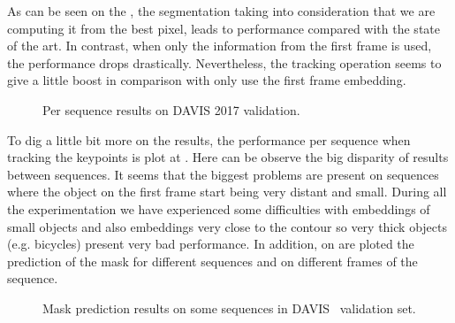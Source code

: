As can be seen on the , the segmentation taking into consideration that we are computing it from the best pixel, leads to performance compared with the state of the art.
In contrast, when only the information from the first frame is used, the performance drops drastically.
Nevertheless, the tracking operation seems to give a little boost in comparison with only use the first frame embedding.

\begin{figure}[H]
  \centering
  
  \caption{Per sequence results on DAVIS 2017 validation. }
  \label{fig:per_sequence_miou}
\end{figure}

To dig a little bit more on the results, the performance per sequence when tracking the keypoints is plot at .
Here can be observe the big disparity of results between sequences.
It seems that the biggest problems are present on sequences where the object on the first frame start being very distant and small.
During all the experimentation we have experienced some difficulties with embeddings of small objects and also embeddings very close to the contour so very thick objects (e.g. bicycles) present very bad performance.
In addition, on  are ploted the prediction of the mask for different sequences and on different frames of the sequence.

\begin{figure}[ht]
  \centering
  \caption{Mask prediction results on some sequences in DAVIS~ validation set. }
  \label{fig:pred_masks_davis}
\end{figure}

